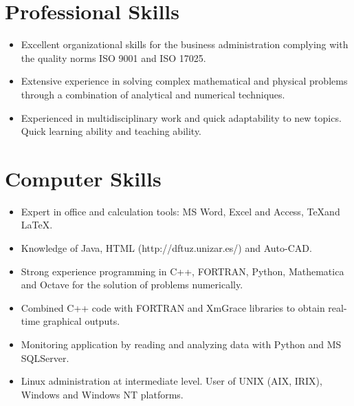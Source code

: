\documentclass{article}
\begin{document}

\section*{Professional Skills}

\begin{itemize}\itemsep 0pt
\item Excellent organizational skills for the business administration complying with the quality norms ISO 9001 and ISO 17025.

\item Extensive experience in solving complex mathematical and physical 
problems through a combination of analytical and numerical techniques.

\item Experienced in multidisciplinary work and quick adaptability 
to new topics. Quick learning ability and teaching ability.
\end{itemize}


\section*{Computer Skills}

\begin{itemize}\itemsep 0pt
\item Expert in office and calculation tools: MS Word, Excel and Access, \TeX and \LaTeX.

\item Knowledge of Java, HTML (http://dftuz.unizar.es/) and Auto-CAD.

\item Strong experience programming in C++, FORTRAN, Python, Mathematica and Octave for the solution of problems numerically.

\item Combined C++ code with FORTRAN and XmGrace libraries to obtain real-time graphical outputs.

\item Monitoring application by reading and analyzing data with Python and MS SQLServer.

\item Linux administration at intermediate level.  
User of UNIX (AIX, IRIX), Windows and Windows NT platforms.
\end{itemize}
\end{document}
